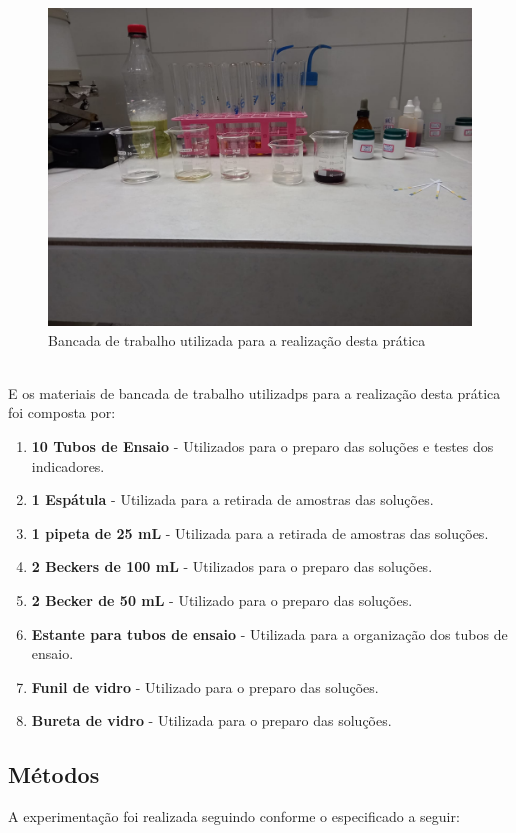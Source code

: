 \documentclass[a4paper, 11pt]{article}
\begin{document}
    \begin{figure}[h]
        \centering
        \includegraphics[scale=0.25]{pictures/bancada.jpeg}
        \caption{Bancada de trabalho utilizada para a realização desta prática}\label{fig:figure1}
    \end{figure}\\

    \indent E os materiais de bancada de trabalho utilizadps para a realização desta prática foi composta por:
    \begin{enumerate}
        \item \textbf{10 Tubos de Ensaio} - Utilizados para o preparo das soluções e testes dos indicadores.
        \item \textbf{1 Espátula} - Utilizada para a retirada de amostras das soluções.
        \item \textbf{1 pipeta de 25 mL} - Utilizada para a retirada de amostras das soluções.
        \item \textbf{2 Beckers de 100 mL} - Utilizados para o preparo das soluções.
        \item \textbf{2 Becker de 50 mL} - Utilizado para o preparo das soluções.
        \item \textbf{Estante para tubos de ensaio} - Utilizada para a organização dos tubos de ensaio.
        \item \textbf{Funil de vidro} - Utilizado para o preparo das soluções.
        \item \textbf{Bureta de vidro} - Utilizada para o preparo das soluções.
    \end{enumerate}
\newpage
    \subsection{Métodos}\label{sec:mat_metodos}
        \indent A experimentação foi realizada seguindo conforme o especificado a seguir:
\end{document}
